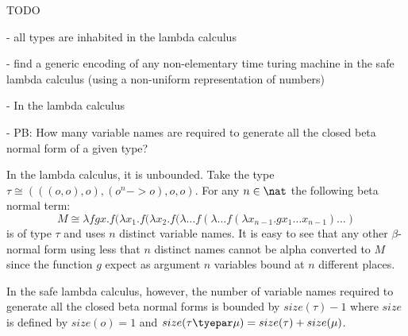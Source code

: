 TODO

- all types are inhabited in the lambda calculus

- find a generic encoding of any non-elementary time turing machine
in the safe lambda calculus (using a non-uniform representation of
numbers)

- In the lambda calculus

- PB: How many variable names are required to generate all the
closed beta normal form of a given type?

In the lambda calculus, it is unbounded. Take the type $\tau \cong
(((o,o),o), (o^n->o), o, o)$. For any $n\in\nat$ the following beta
normal term:
$$ M \cong \lambda f g x . f (\lambda x_1.f(\lambda x_2.f(\lambda \ldots f(\lambda \ldots f(\lambda x_{n-1}.g x_1 \ldots x_{n-1}) \ldots )$$
is of type $\tau$ and uses $n$ distinct variable names. It is easy to see that
any other $\beta$-normal form using less that $n$ distinct names cannot be alpha converted to $M$
since the function $g$ expect as argument $n$ variables bound at $n$ different places.


In the safe lambda calculus, however, the number of variable names required to generate
all the closed beta normal forms is bounded by $size(\tau)-1$ where $size$ is defined by
$size(o)= 1$ and $size(\tau\tyepar\mu) = size(\tau) + size(\mu)$.
